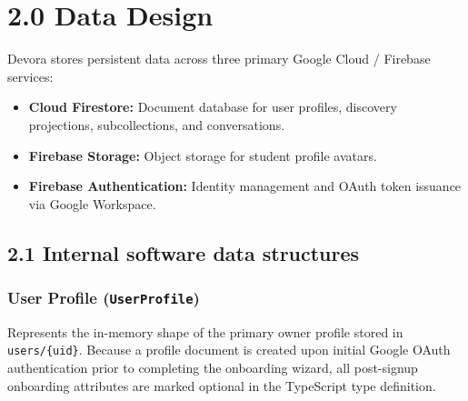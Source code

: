 \documentclass[11pt,letterpaper]{article}
\begin{document}
\newpage
\section*{2.0 Data Design}

Devora stores persistent data across three primary Google Cloud / Firebase services:
\begin{itemize}[leftmargin=*,noitemsep]
\item \textbf{Cloud Firestore:} Document database for user profiles, discovery projections, subcollections, and conversations.
\item \textbf{Firebase Storage:} Object storage for student profile avatars.
\item \textbf{Firebase Authentication:} Identity management and OAuth token issuance via Google Workspace.
\end{itemize}

\subsection*{2.1 Internal software data structures}

\subsubsection*{User Profile (\texttt{UserProfile})}
Represents the in-memory shape of the primary owner profile stored in \texttt{users/\{uid\}}. Because a profile document is created upon initial Google OAuth authentication prior to completing the onboarding wizard, all post-signup onboarding attributes are marked optional in the TypeScript type definition.
\end{document}
